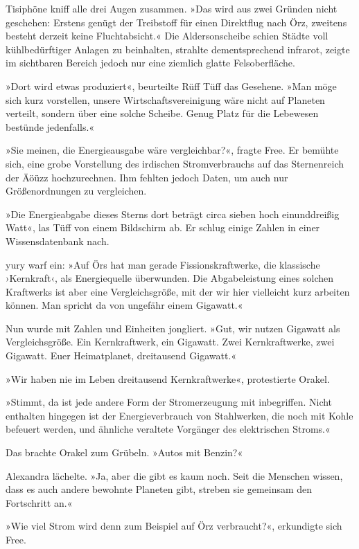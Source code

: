 Tisiphöne kniff alle drei Augen zusammen. »Das wird aus zwei Gründen nicht geschehen: Erstens genügt der Treibstoff für einen Direktflug nach Örz, zweitens besteht derzeit keine Fluchtabsicht.« Die Aldersonscheibe schien Städte voll kühlbedürftiger Anlagen zu beinhalten, strahlte dementsprechend infrarot, zeigte im sichtbaren Bereich jedoch nur eine ziemlich glatte Felsoberfläche.

»Dort wird etwas produziert«, beurteilte Rüff Tüff das Gesehene. »Man möge sich kurz vorstellen, unsere Wirtschaftsvereinigung wäre nicht auf Planeten verteilt, sondern über eine solche Scheibe. Genug Platz für die Lebewesen bestünde jedenfalls.«

»Sie meinen, die Energieausgabe wäre vergleichbar?«, fragte Free. Er bemühte sich, eine grobe Vorstellung des irdischen Stromverbrauchs auf das Sternenreich der Äöüzz hochzurechnen. Ihm fehlten jedoch Daten, um auch nur Größenordnungen zu vergleichen.

»Die Energieabgabe dieses Sterns dort beträgt circa sieben hoch einunddreißig Watt«, las Tüff von einem Bildschirm ab. Er schlug einige Zahlen in einer Wissensdatenbank nach.

yury warf ein: »Auf Örs hat man gerade Fissionskraftwerke, die klassische ›Kernkraft‹, als Energiequelle überwunden. Die Abgabeleistung eines solchen Kraftwerks ist aber eine Vergleichsgröße, mit der wir hier vielleicht kurz arbeiten können. Man spricht da von ungefähr einem Gigawatt.«

Nun wurde mit Zahlen und Einheiten jongliert. »Gut, wir nutzen Gigawatt als Vergleichsgröße. Ein Kernkraftwerk, ein Gigawatt. Zwei Kernkraftwerke, zwei Gigawatt. Euer Heimatplanet, dreitausend Gigawatt.«

»Wir haben nie im Leben dreitausend Kernkraftwerke«, protestierte Orakel.

»Stimmt, da ist jede andere Form der Stromerzeugung mit inbegriffen. Nicht enthalten hingegen ist der Energieverbrauch von Stahlwerken, die noch mit Kohle befeuert werden, und ähnliche veraltete Vorgänger des elektrischen Stroms.«

Das brachte Orakel zum Grübeln. »Autos mit Benzin?«

Alexandra lächelte. »Ja, aber die gibt es kaum noch. Seit die Menschen wissen, dass es auch andere bewohnte Planeten gibt, streben sie gemeinsam den Fortschritt an.«

»Wie viel Strom wird denn zum Beispiel auf Örz verbraucht?«, erkundigte sich Free.

